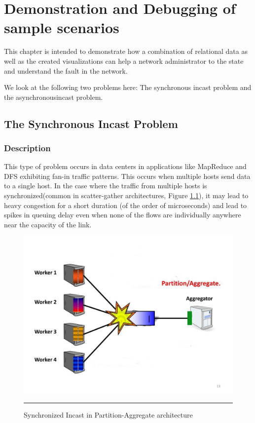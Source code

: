 
\chapter{Demonstration and Debugging of sample scenarios} %

\label{Chapter5} %



This chapter is intended to demonstrate how a combination of relational data as well as the created
visualizations can help a network administrator to the state and understand the fault in the network.

We look at the following two problems here: The synchronous incast problem and the asynchronousincast problem.

\section{The Synchronous Incast Problem}

\subsection{Description}

This type of problem occurs in data centers in applications like MapReduce and DFS exhibiting fan-in traffic patterns.
This occurs when multiple hosts send data to a single host. In the case where the traffic from multiple hosts is
synchronized(common in scatter-gather architectures, Figure \ref{fig:Synch Incast}), it may lead to heavy congestion for a short duration (of the
order of microseconds\cite{microburst}) and lead to spikes in queuing delay even when none of the flows are individually anywhere near
the capacity of the link.

\begin{figure}[htbp]
	\centering
		\includegraphics[width=0.65\columnwidth]{Figures/sync_incast.jpg}
		\rule{35em}{0.5pt}
	\caption[Synchronized Incast]{Synchronized Incast in Partition-Aggregate architecture}
	\label{fig:Synch Incast}
\end{figure}

